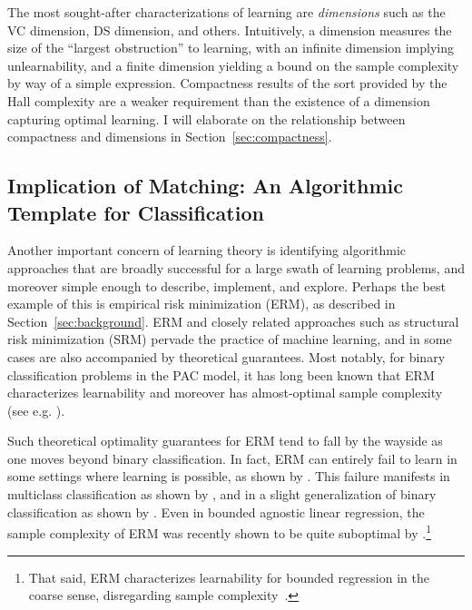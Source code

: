 The most sought-after characterizations of learning are \emph{dimensions} such as the VC dimension, DS dimension, and others. Intuitively, a dimension measures the size of the ``largest obstruction'' to learning, with an infinite dimension implying unlearnability, and a finite dimension yielding a bound on the sample complexity by way of a simple expression. Compactness results of the sort provided by the Hall complexity are a weaker requirement than the existence of a dimension capturing optimal learning. I will elaborate on the relationship between compactness and dimensions in Section~\ref{sec:compactness}.  %



\subsection{Implication of Matching: An Algorithmic Template for Classification}
Another important concern of learning theory is identifying algorithmic approaches that are broadly successful for a large swath of learning problems, and moreover simple enough to describe, implement, and explore. Perhaps the best example of this is empirical risk minimization (ERM), as described in Section~\ref{sec:background}. ERM and closely related approaches such as structural risk minimization (SRM) pervade the practice of machine learning, and in some cases are also accompanied by theoretical guarantees.  Most notably, for binary classification problems in the PAC model, it has long been known that ERM characterizes learnability and moreover has almost-optimal sample complexity (see e.g. \cite{shalev-shwartz_understanding_2014}).

Such theoretical optimality guarantees  for ERM  tend to fall by the wayside as one moves beyond binary classification.  In fact, ERM can entirely fail to learn in some settings where learning is possible, as shown by \citet{shalev-shwartz_learnability_2010}.   This failure manifests   in multiclass classification as shown by \citet{daniely_multiclass_2011}, and in a slight generalization of binary classification as shown by \citet{alon_theory_2021}. Even in bounded agnostic linear regression, the sample complexity of ERM was recently shown to be quite suboptimal by \citet{vaskevicius_suboptimality_2023}.\footnote{That said, ERM characterizes learnability for bounded regression  in the coarse sense, disregarding sample complexity~\cite{alon_scale-sensitive_1997}.}  %

